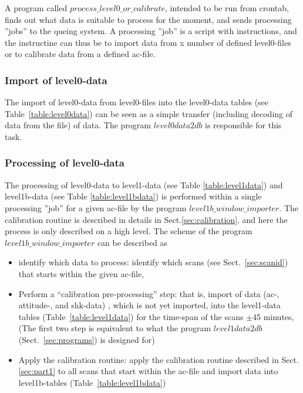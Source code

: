 \documentclass[12pt]{article}
\begin{document}
A program called \(process\_level0\_or\_calibrate\), intended to be run
from crontab, finds out what data is suitable to process for the moment,
and sends processing ''jobs'' to the queing system.
A processing ''job'' is a script with instructions, 
and the instructine can thus be to import data from
x number of defined level0-files or to calibrate data from a defined 
ac-file.




\subsubsection{Import of level0-data}
\label{sec:level0import}
The import of level0-data from level0-files
into the level0-data tables (see Table~\ref{table:level0data})
can be seen as a simple transfer (including decoding of data from the file) 
of data. The program \(level0data2db\) is responsible for this task.  
 

\subsubsection{Processing of level0-data}
\label{sec:level0processing}
The processing of level0-data to level1-data (see Table \ref{table:level1data}) 
and level1b-data (see Table \ref{table:level1bdata}) is performed
within a single processing ''job'' for a given ac-file 
by the program \(level1b\_window\_importer\).
The calibration routine is described in details in Sect.\ref{sec:calibration},
and here the process is only described on a high level.
The scheme of the program \(level1b\_window\_importer\) 
can be described as
\begin{itemize}
\item identify which data to process:\newline
identify which scans (see Sect.~\ref{sec:scanid}) that starts 
within the given ac-file,
\item Perform a ``calibration pre-processing'' step:\newline
that is, import of data (ac-, attitude-, and shk-data) , which is not 
yet imported, into the level1-data tables (Table~\ref{table:level1data}) 
for the time-span of the scans \(\pm\)45 minutes,
(The first two step is equivalent to what the program \(level1data2db\)
(Sect.~\ref{sec:programs}) is designed for)
\item Apply the calibration routine:\newline
apply the calibration routine described in Sect.\ref{sec:part1}
to all scans that start within the ac-file and import data into level1b-tables
(Table~\ref{table:level1bdata})

\end{itemize}
\end{document}
